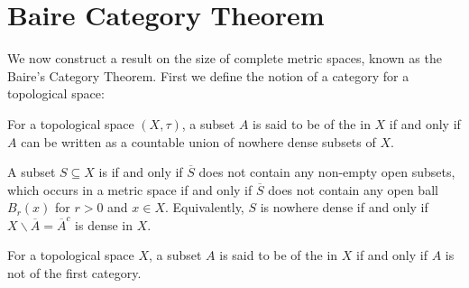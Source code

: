\section{Baire Category Theorem}

We now construct a result on the size of complete metric spaces, known as the Baire's Category Theorem. First we define the notion of a category for a topological space:

\begin{definition}
    For a topological space $(X,\tau)$, a subset $A$ is said to be of the  in $X$ if and only if $A$ can be written as a countable union of nowhere dense subsets of $X$.
\end{definition}

\begin{definition}
    A subset $S \subseteq X$ is  if and only if $\overline{S}$ does not contain any non-empty open subsets, which occurs in a metric space if and only if $\overline{S}$ does not contain any open ball $B_r(x)$ for $r > 0$ and $x \in X$. Equivalently, $S$ is nowhere dense if and only if $X\backslash\overline{A} = \overline{A}^c$ is dense in $X$.
\end{definition}

\begin{definition}
    For a topological space $X$, a subset $A$ is said to be of the  in $X$ if and only if $A$ is not of the first category.
\end{definition}

